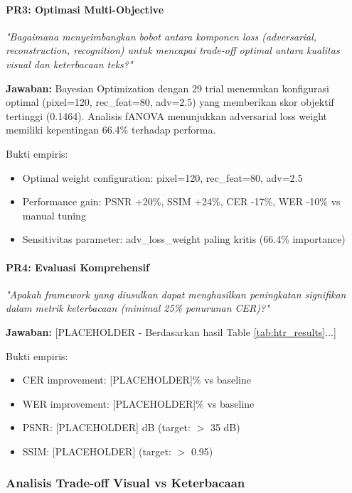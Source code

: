 \documentclass{article}
\begin{document}
\paragraph{PR3: Optimasi Multi-Objective}

\textit{"Bagaimana menyeimbangkan bobot antara komponen loss (adversarial, reconstruction, recognition) untuk mencapai trade-off optimal antara kualitas visual dan keterbacaan teks?"}

\textbf{Jawaban:} Bayesian Optimization dengan 29 trial menemukan konfigurasi optimal (pixel=120, rec\_feat=80, adv=2.5) yang memberikan skor objektif tertinggi (0.1464). Analisis fANOVA menunjukkan adversarial loss weight memiliki kepentingan 66.4\% terhadap performa.

Bukti empiris:
\begin{itemize}
    \item Optimal weight configuration: pixel=120, rec\_feat=80, adv=2.5
    \item Performance gain: PSNR +20\%, SSIM +24\%, CER -17\%, WER -10\% vs manual tuning
    \item Sensitivitas parameter: adv\_loss\_weight paling kritis (66.4\% importance)
\end{itemize}

\paragraph{PR4: Evaluasi Komprehensif}

\textit{"Apakah framework yang diusulkan dapat menghasilkan peningkatan signifikan dalam metrik keterbacaan (minimal 25\% penurunan CER)?"}

\textbf{Jawaban:} [PLACEHOLDER - Berdasarkan hasil Table \ref{tab:htr_results}...]

Bukti empiris:
\begin{itemize}
    \item CER improvement: [PLACEHOLDER]\% vs baseline
    \item WER improvement: [PLACEHOLDER]\% vs baseline
    \item PSNR: [PLACEHOLDER] dB (target: $>$ 35 dB)
    \item SSIM: [PLACEHOLDER] (target: $>$ 0.95)
\end{itemize}

\subsubsection{Analisis Trade-off Visual vs Keterbacaan}
\end{document}
